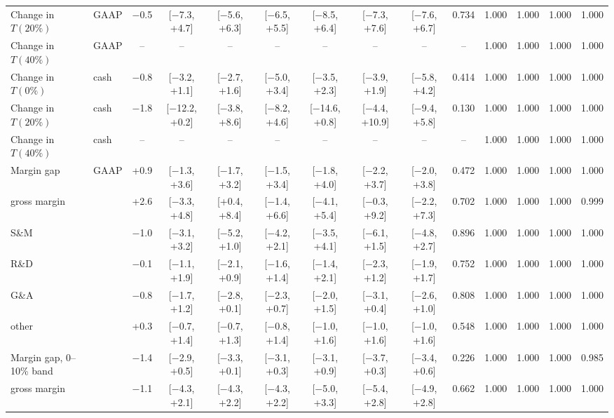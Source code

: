 \begin{table}[t]
{\begin{tabular}{llcccccccccccc}
Change in $T(20\%)$ & GAAP & $-$0.5 & [$-$7.3, +4.7] & [$-$5.6, +6.3] & [$-$6.5, +5.5] & [$-$8.5, +6.4] & [$-$7.3, +7.6] & [$-$7.6, +6.7] & 0.734 & 1.000 & 1.000 & 1.000 & 1.000 \\
Change in $T(40\%)$ & GAAP & -- & -- & -- & -- & -- & -- & -- & -- & 1.000 & 1.000 & 1.000 & 1.000 \\
Change in $T(0\%)$ & cash & $-$0.8 & [$-$3.2, +1.1] & [$-$2.7, +1.6] & [$-$5.0, +3.4] & [$-$3.5, +2.3] & [$-$3.9, +1.9] & [$-$5.8, +4.2] & 0.414 & 1.000 & 1.000 & 1.000 & 1.000 \\
Change in $T(20\%)$ & cash & $-$1.8 & [$-$12.2, +0.2] & [$-$3.8, +8.6] & [$-$8.2, +4.6] & [$-$14.6, +0.8] & [$-$4.4, +10.9] & [$-$9.4, +5.8] & 0.130 & 1.000 & 1.000 & 1.000 & 1.000 \\
Change in $T(40\%)$ & cash & -- & -- & -- & -- & -- & -- & -- & -- & 1.000 & 1.000 & 1.000 & 1.000 \\
Margin gap & GAAP & +0.9 & [$-$1.3, +3.6] & [$-$1.7, +3.2] & [$-$1.5, +3.4] & [$-$1.8, +4.0] & [$-$2.2, +3.7] & [$-$2.0, +3.8] & 0.472 & 1.000 & 1.000 & 1.000 & 1.000 \\
\quad gross margin &  & +2.6 & [$-$3.3, +4.8] & [+0.4, +8.4] & [$-$1.4, +6.6] & [$-$4.1, +5.4] & [$-$0.3, +9.2] & [$-$2.2, +7.3] & 0.702 & 1.000 & 1.000 & 1.000 & 0.999 \\
\quad S\&M &  & $-$1.0 & [$-$3.1, +3.2] & [$-$5.2, +1.0] & [$-$4.2, +2.1] & [$-$3.5, +4.1] & [$-$6.1, +1.5] & [$-$4.8, +2.7] & 0.896 & 1.000 & 1.000 & 1.000 & 1.000 \\
\quad R\&D &  & $-$0.1 & [$-$1.1, +1.9] & [$-$2.1, +0.9] & [$-$1.6, +1.4] & [$-$1.4, +2.1] & [$-$2.3, +1.2] & [$-$1.9, +1.7] & 0.752 & 1.000 & 1.000 & 1.000 & 1.000 \\
\quad G\&A &  & $-$0.8 & [$-$1.7, +1.2] & [$-$2.8, +0.1] & [$-$2.3, +0.7] & [$-$2.0, +1.5] & [$-$3.1, +0.4] & [$-$2.6, +1.0] & 0.808 & 1.000 & 1.000 & 1.000 & 1.000 \\
\quad other &  & +0.3 & [$-$0.7, +1.4] & [$-$0.7, +1.3] & [$-$0.8, +1.4] & [$-$1.0, +1.6] & [$-$1.0, +1.6] & [$-$1.0, +1.6] & 0.548 & 1.000 & 1.000 & 1.000 & 1.000 \\
Margin gap, 0--10\% band &  & $-$1.4 & [$-$2.9, +0.5] & [$-$3.3, +0.1] & [$-$3.1, +0.3] & [$-$3.1, +0.9] & [$-$3.7, +0.3] & [$-$3.4, +0.6] & 0.226 & 1.000 & 1.000 & 1.000 & 0.985 \\
\quad gross margin &  & $-$1.1 & [$-$4.3, +2.1] & [$-$4.3, +2.2] & [$-$4.3, +2.2] & [$-$5.0, +3.3] & [$-$5.4, +2.8] & [$-$4.9, +2.8] & 0.662 & 1.000 & 1.000 & 1.000 & 1.000 \\

\end{tabular}}
\end{table}

